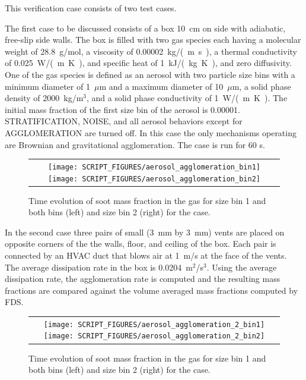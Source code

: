 \documentclass[11pt]{book}
\begin{document}
This verification case consists of two test cases.

The first case to be discussed consists of a box 10~cm on side with adiabatic, free-slip side walls. The box is filled with two gas species each having a molecular weight of 28.8~g/mol, a viscosity of 0.00002~\si{kg/(m.s)}, a thermal conductivity of 0.025~\si{W/(m.K)}, and specific heat of 1~\si{kJ/(kg.K)}, and zero diffusivity. One of the gas species is defined as an aerosol with two particle size bins with a minimum diameter of 1~$\mu$m and a maximum diameter of 10~$\mu$m, a solid phase density of 2000~kg/m$^3$, and a solid phase conductivity of 1~\si{W/(m.K)}. The initial mass fraction of the first size bin of the aerosol is 0.00001. {\ct STRATIFICATION}, {\ct NOISE}, and all aerosol behaviors except for {\ct AGGLOMERATION} are turned off. In this case the only mechanisms operating are Brownian and gravitational agglomeration. The case is run for 60 s.

\begin{figure}[ht]
	\centering
	\begin{tabular}{c}
		\texttt{[image: SCRIPT\_FIGURES/aerosol\_agglomeration\_bin1]}
		\texttt{[image: SCRIPT\_FIGURES/aerosol\_agglomeration\_bin2]}
	\end{tabular}
	\caption[Gas phase soot mass fractions the  cases]{Time evolution of soot mass fraction in the gas for size bin 1 and both bins (left) and size bin 2 (right) for the  case.}
	\label{fig:agglomeration}
\end{figure}

In the second case three pairs of small (3~mm by 3~mm) vents are placed on opposite corners of the the walls, floor, and ceiling of the box. Each pair is connected by an HVAC duct that blows air at 1~m/s at the face of the vents. The average dissipation rate in the box is 0.0204~m$^2$/s$^3$. Using the average dissipation rate, the agglomeration rate is computed and the resulting mass fractions are compared against the volume averaged mass fractions computed by FDS.

\begin{figure}[ht]
	\centering
	\begin{tabular}{c}
		\texttt{[image: SCRIPT\_FIGURES/aerosol\_agglomeration\_2\_bin1]}
		\texttt{[image: SCRIPT\_FIGURES/aerosol\_agglomeration\_2\_bin2]}
	\end{tabular}
	\caption[Gas phase soot mass fractions the  cases]{Time evolution of soot mass fraction in the gas for size bin 1 and both bins (left) and size bin 2 (right) for the  case.}
	\label{fig:agglomeration_2}
\end{figure}
\end{document}
